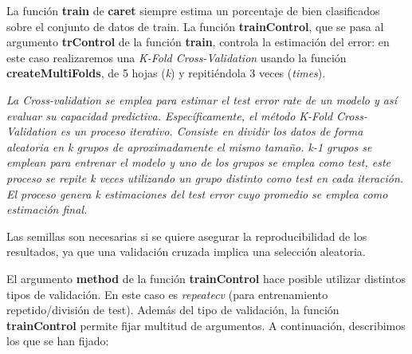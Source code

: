 \documentclass[
]{article}
\newenvironment{Shaded}{\begin{snugshade}}{\end{snugshade}}
\newcommand{\DataTypeTok}[1]{\textcolor[rgb]{0.13,0.29,0.53}{#1}}
\newcommand{\DecValTok}[1]{\textcolor[rgb]{0.00,0.00,0.81}{#1}}
\newcommand{\KeywordTok}[1]{\textcolor[rgb]{0.13,0.29,0.53}{\textbf{#1}}}
\newcommand{\NormalTok}[1]{#1}
\newcommand{\OperatorTok}[1]{\textcolor[rgb]{0.81,0.36,0.00}{\textbf{#1}}}
\newcommand{\OtherTok}[1]{\textcolor[rgb]{0.56,0.35,0.01}{#1}}
\newcommand{\StringTok}[1]{\textcolor[rgb]{0.31,0.60,0.02}{#1}}
\begin{document}
La función \textbf{train} de \textbf{caret} siempre estima un porcentaje
de bien clasificados sobre el conjunto de datos de train. La función
\textbf{trainControl}, que se pasa al argumento \textbf{trControl} de la
función \textbf{train}, controla la estimación del error: en este caso
realizaremos una \emph{K-Fold Cross-Validation} usando la función
\textbf{createMultiFolds}, de 5 hojas (\emph{k}) y repitiéndola 3 veces
(\emph{times}).

\emph{La Cross-validation se emplea para estimar el test error rate de
un modelo y así evaluar su capacidad predictiva. Específicamente, el
método K-Fold Cross-Validation es un proceso iterativo. Consiste en
dividir los datos de forma aleatoria en k grupos de aproximadamente el
mismo tamaño. k-1 grupos se emplean para entrenar el modelo y uno de los
grupos se emplea como test, este proceso se repite k veces utilizando un
grupo distinto como test en cada iteración. El proceso genera k
estimaciones del test error cuyo promedio se emplea como estimación
final.}

Las semillas son necesarias si se quiere asegurar la reproducibilidad de
los resultados, ya que una validación cruzada implica una selección
aleatoria.

\begin{Shaded}
\end{Shaded}

El argumento \textbf{method} de la función \textbf{trainControl} hace
posible utilizar distintos tipos de validación. En este caso es
\emph{repeatecv} (para entrenamiento repetido/división de test). Además
del tipo de validación, la función \textbf{trainControl} permite fijar
multitud de argumentos. A continuación, describimos los que se han
fijado:
\end{document}

